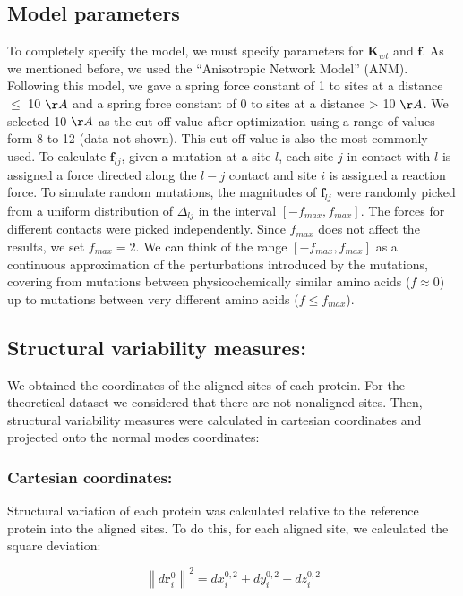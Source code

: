 \documentclass{article}
\begin{document}
\begin{multicols}{2}
{{\section*{Model parameters}
To completely specify the model, we must specify parameters for $\mathbf{K}_{wt}$ and $\mathbf{f}$. As we mentioned before, we used the ``Anisotropic Network Model'' (ANM). Following this model, we gave a spring force constant of 1 to sites at a distance $\leq$ 10 $\AA$ and a spring force constant of 0 to sites at a distance > 10 $\AA$. We selected 10 $\AA$ as the cut off value after optimization using a range of values form 8 to 12 (data not shown). This cut off value is also the most commonly used.
To calculate $\mathbf{f}_{lj}$, given a mutation at a site $l$, each site $j$ in contact with $l$ is assigned a force directed along the $l-j$ contact and site $i$ is assigned a reaction force. To simulate random mutations, the magnitudes of $\mathbf{f}_{lj}$ were randomly picked from a uniform distribution of $\Delta_{lj}$ in the interval $[- f_{max},f_{max}]$. The forces for different contacts were picked independently. Since $f_{max}$ does not affect the results, we set $f_{max} = 2$. We can think of the range $[-f_{max}, f_{max}]$ as a continuous approximation of the perturbations introduced by the mutations, covering from mutations between physicochemically similar amino acids ($f \approx 0$) up to mutations between very different amino acids ($f \leq f_{max}$).

\subsection*{ Structural variability measures:}
We obtained the coordinates of the aligned sites of each protein. For the theoretical dataset we considered that there are not nonaligned sites. Then, structural variability measures were calculated in cartesian coordinates and projected onto the normal modes coordinates:

\subsubsection*{ Cartesian coordinates:}
Structural variation of each protein was calculated relative to the reference protein into the aligned sites. To do this, for each aligned site, we calculated the square deviation:
 
\begin{equation} \label{eq:drSquarei}
\left\|d\mathbf{r}^{0}_{i}\right\|^{2}=dx^{0,2}_{i}+dy^{0,2}_{i}+dz^{0,2}_{i}
\end{equation}

}}
\end{multicols}
\end{document}
